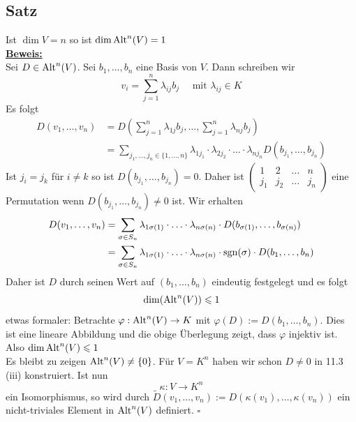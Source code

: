 \subsection{Satz} %
\label{sub:satz}
Ist $\dim V = n$ so ist $ \dim \operatorname{Alt}^n(V) = 1$
\vspace{\baselineskip} \\
\underline{\textbf{Beweis:}} \\
Sei $D \in \operatorname{Alt}^n (V)$. Sei $b_1, \ldots , b_n$ eine Basis von $V$. Dann schreiben wir
\[
	v_i = \sum\limits_{j=1}^{n} \lambda _{ij} b_j \quad \text{ mit } \lambda_{ij} \in K
\]
Es folgt
\begin{align*}
	D(v_1, \ldots , v_n) &= D \left( \sum\limits_{j=1}^{n}  \lambda_{1j} b_j , \ldots , \sum\limits_{j=1}^{n} \lambda_{nj} b_j  \right) \\
	&= \sum\limits_{j_1, \ldots , j_n \in \{ 1, \ldots , n \} } \lambda_{1 j_1} \cdot  \lambda_{2 j_2} \cdot  \ldots \cdot  \lambda_{n j_n}
	D(b_{j_1} , \ldots , b_{j_n})
\end{align*}
Ist $j_i = j_k$ für $i \not= k$ so ist $D(b_{j_1} , \ldots , b_{j_n})= 0$. Daher ist $\begin{pmatrix}
	1 & 2 & \ldots & n \\
	j_1 & j_2 & \ldots & j_n
\end{pmatrix}$ eine Permutation wenn $D(b_{j_1} , \ldots , b_{j_n}) \not= 0$ ist. Wir erhalten
\begin{align*}
	D(v_1, \ldots , v_n) &= \sum\limits_{\sigma \in S_n} \lambda_{1 \sigma(1)} \cdot  \ldots \cdot \lambda_{n \sigma(n)} \cdot D( b_{\sigma(1)} , \ldots , b_{\sigma(n)})\\
	&= \sum\limits_{\sigma \in S_n} \lambda_{1 \sigma(1)} \cdot \ldots \cdot \lambda_{n \sigma(n)} \cdot \operatorname{sgn}(\sigma) \cdot D(b_1, \ldots, b_n)
\end{align*}
Daher ist $D$ durch seinen Wert auf $(b_1, \ldots , b_n)$ eindeutig festgelegt und es folgt
\[
	\dim ( \operatorname{Alt}^n(V)) \leqslant 1
\]
etwas formaler: Betrachte $\varphi : \operatorname{Alt}^n(V) \to K$ mit $\varphi(D) := D(b_1, \ldots , b_n)$. Dies ist eine lineare Abbildung und die obige Überlegung zeigt,
dass $\varphi$ injektiv ist. Also $\dim \operatorname{Alt}^n(V) \leqslant 1$
\vspace{10pt} \\
Es bleibt zu zeigen $\operatorname{Alt}^n(V) \not= \{ 0\}$. Für $V=K^n$ haben wir schon $D \not= 0$ in 11.3 (iii) konstruiert. Ist nun
\[
	\kappa : V \to K^n
\]
ein Isomorphismus, so wird durch $\tilde D(v_1, \ldots , v_n) := D(\kappa(v_1), \ldots , \kappa(v_n))$ ein nicht-triviales Element in $\operatorname{Alt}^n(V)$ definiert. 
\hfill \( \square \)

